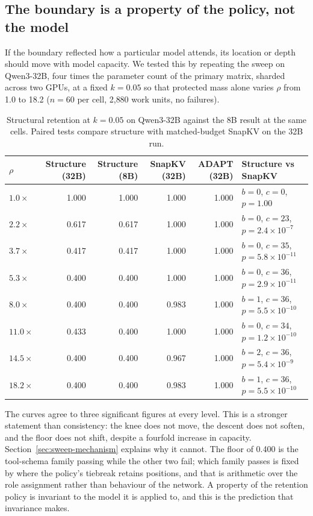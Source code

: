 \subsection{The boundary is a property of the policy, not the model}
\label{sec:sweep-scale}

If the boundary reflected how a particular model attends, its location or depth
should move with model capacity.  We tested this by repeating the sweep on
Qwen3-32B, four times the parameter count of the primary matrix, sharded across
two GPUs, at a fixed $k=0.05$ so that protected mass alone varies $\rho$ from
1.0 to 18.2 ($n=60$ per cell, 2{,}880 work units, no failures).

\begin{table}[!htbp]
  \centering
  \caption{Structural retention at $k=0.05$ on Qwen3-32B against the 8B result
  at the same cells.  Paired tests compare structure with matched-budget SnapKV
  on the 32B run.}
  \label{tab:scale}
  \begin{tabular}{lrrrrl}
    \toprule
    $\rho$ & Structure (32B) & Structure (8B) & SnapKV (32B) & ADAPT (32B) & Structure vs SnapKV \\
    \midrule
    $1.0\times$  & 1.000 & 1.000 & 1.000 & 1.000 & $b{=}0$, $c{=}0$, $p=1.00$ \\
    $2.2\times$  & 0.617 & 0.617 & 1.000 & 1.000 & $b{=}0$, $c{=}23$, $p=2.4\times10^{-7}$ \\
    $3.7\times$  & 0.417 & 0.417 & 1.000 & 1.000 & $b{=}0$, $c{=}35$, $p=5.8\times10^{-11}$ \\
    $5.3\times$  & 0.400 & 0.400 & 1.000 & 1.000 & $b{=}0$, $c{=}36$, $p=2.9\times10^{-11}$ \\
    $8.0\times$  & 0.400 & 0.400 & 0.983 & 1.000 & $b{=}1$, $c{=}36$, $p=5.5\times10^{-10}$ \\
    $11.0\times$ & 0.433 & 0.400 & 1.000 & 1.000 & $b{=}0$, $c{=}34$, $p=1.2\times10^{-10}$ \\
    $14.5\times$ & 0.400 & 0.400 & 0.967 & 1.000 & $b{=}2$, $c{=}36$, $p=5.4\times10^{-9}$ \\
    $18.2\times$ & 0.400 & 0.400 & 0.983 & 1.000 & $b{=}1$, $c{=}36$, $p=5.5\times10^{-10}$ \\
    \bottomrule
  \end{tabular}
\end{table}

The curves agree to three significant figures at every level.  This is a
stronger statement than consistency: the knee does not move, the descent does
not soften, and the floor does not shift, despite a fourfold increase in
capacity.  Section~\ref{sec:sweep-mechanism} explains why it cannot.  The floor
of 0.400 is the tool-schema family passing while the other two fail; which
family passes is fixed by where the policy's tiebreak retains positions, and
that is arithmetic over the role assignment rather than behaviour of the
network.  A property of the retention policy is invariant to the model it is
applied to, and this is the prediction that invariance makes.

